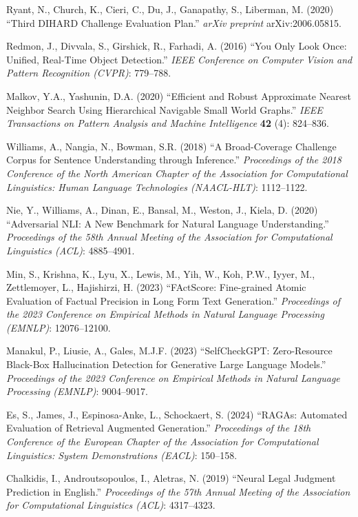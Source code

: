 \documentclass[3p,times,procedia]{elsarticle}
\begin{document}
\begin{thebibliography}{}
Ryant, N., Church, K., Cieri, C., Du, J., Ganapathy, S., Liberman, M. (2020) ``Third DIHARD Challenge Evaluation Plan.'' {\it arXiv preprint} arXiv:2006.05815.

Redmon, J., Divvala, S., Girshick, R., Farhadi, A. (2016) ``You Only Look Once: Unified, Real-Time Object Detection.'' {\it IEEE Conference on Computer Vision and Pattern Recognition (CVPR)}: 779--788.

Malkov, Y.A., Yashunin, D.A. (2020) ``Efficient and Robust Approximate Nearest Neighbor Search Using Hierarchical Navigable Small World Graphs.'' {\it IEEE Transactions on Pattern Analysis and Machine Intelligence} {\bf 42} (4): 824--836.

Williams, A., Nangia, N., Bowman, S.R. (2018) ``A Broad-Coverage Challenge Corpus for Sentence Understanding through Inference.'' {\it Proceedings of the 2018 Conference of the North American Chapter of the Association for Computational Linguistics: Human Language Technologies (NAACL-HLT)}: 1112--1122.

Nie, Y., Williams, A., Dinan, E., Bansal, M., Weston, J., Kiela, D. (2020) ``Adversarial NLI: A New Benchmark for Natural Language Understanding.'' {\it Proceedings of the 58th Annual Meeting of the Association for Computational Linguistics (ACL)}: 4885--4901.

Min, S., Krishna, K., Lyu, X., Lewis, M., Yih, W., Koh, P.W., Iyyer, M., Zettlemoyer, L., Hajishirzi, H. (2023) ``FActScore: Fine-grained Atomic Evaluation of Factual Precision in Long Form Text Generation.'' {\it Proceedings of the 2023 Conference on Empirical Methods in Natural Language Processing (EMNLP)}: 12076--12100.

Manakul, P., Liusie, A., Gales, M.J.F. (2023) ``SelfCheckGPT: Zero-Resource Black-Box Hallucination Detection for Generative Large Language Models.'' {\it Proceedings of the 2023 Conference on Empirical Methods in Natural Language Processing (EMNLP)}: 9004--9017.

Es, S., James, J., Espinosa-Anke, L., Schockaert, S. (2024) ``RAGAs: Automated Evaluation of Retrieval Augmented Generation.'' {\it Proceedings of the 18th Conference of the European Chapter of the Association for Computational Linguistics: System Demonstrations (EACL)}: 150--158.

Chalkidis, I., Androutsopoulos, I., Aletras, N. (2019) ``Neural Legal Judgment Prediction in English.'' {\it Proceedings of the 57th Annual Meeting of the Association for Computational Linguistics (ACL)}: 4317--4323.


\end{thebibliography}
\end{document}
